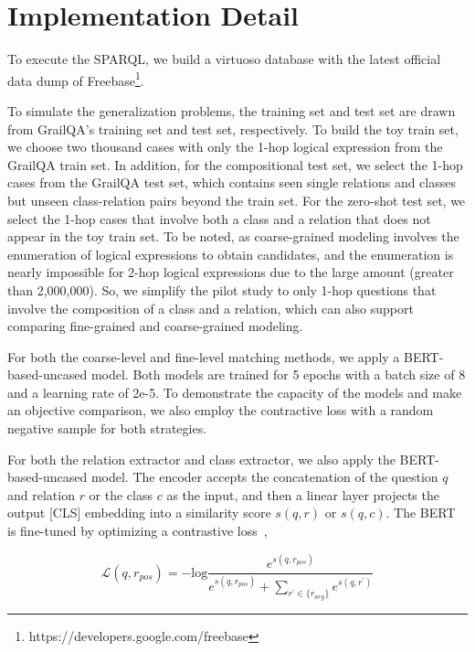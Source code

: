 \section{Implementation Detail}
 To execute the SPARQL, we build a virtuoso database with the latest official data dump of Freebase\footnote{https://developers.google.com/freebase}.

To simulate the generalization problems, the training set and test set are drawn from GrailQA's training set and test set, respectively.
To build the toy train set, we choose two thousand cases with only the 1-hop logical expression from the GrailQA train set. In addition, for the compositional test set, we select the 1-hop cases from the GrailQA test set, which contains seen single relations and classes but unseen class-relation pairs beyond the train set. For the zero-shot test set, we select the 1-hop cases that involve both a class and a relation that does not appear in the toy train set. To be noted, as coarse-grained modeling involves the enumeration of logical expressions to obtain candidates, and the enumeration is nearly impossible for 2-hop logical expressions due to the large amount (greater than 2,000,000). So, we simplify the pilot study to only 1-hop questions that involve the composition of a class and a relation, which can also support comparing fine-grained and coarse-grained modeling.

For both the coarse-level and fine-level matching methods, we apply a BERT-based-uncased model. Both models are trained for 5 epochs with a batch size of 8 and a learning rate of 2e-5. To demonstrate the capacity of the models and make an objective comparison, we also employ the contractive loss with a random negative sample for both strategies.

 For both the relation extractor and class extractor, we also apply the BERT-based-uncased model. The encoder accepts the concatenation of the question $q$ and relation $r$ or the class $c$ as the input, and then a linear layer projects the output [CLS] embedding into a similarity score $s(q, r)$ or $s(q, c)$. The BERT is fine-tuned by optimizing a contrastive loss~\cite{chen2020simple},

\begin{equation}
\mathcal{L}\left({q, r_{pos}}\right) = -\text{log}\frac{e^{s(q, r_{pos})}}{e^{s(q, r_{pos})}+\sum_{r^{'} \in \{r_{neg}\}}{e^{s(q, r^{'})}}}  \nonumber
\label{extractor_loss}
\end{equation}

